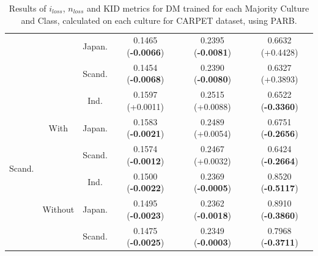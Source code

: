 \begin{table}[H]
\begin{tabular}{c|c|c|c|c|c}
 &  & Japan.   & 0.1465 (\textbf{-0.0066})       & 0.2395 (\textbf{-0.0081})       & 0.6632 (+0.4428) \\
 &  & Scand. & 0.1454 (\textbf{-0.0068})       & 0.2390 (\textbf{-0.0080})       & 0.6327 (+0.3893)  \\
\midrule
\multirow{6}{*}{Scand.} & \multirow{3}{*}{With} & Ind.     & 0.1597 (+0.0011)       & 0.2515 (+0.0088)       & 0.6522 (\textbf{-0.3360})  \\
 &  & Japan.   & 0.1583 (\textbf{-0.0021})       & 0.2489 (+0.0054)       & 0.6751 (\textbf{-0.2656})  \\
 &  & Scand. & 0.1574 (\textbf{-0.0012})       & 0.2467 (+0.0032)       & 0.6424 (\textbf{-0.2664})  \\
\hhline{~-----}
 & \multirow{3}{*}{Without} & Ind.     & 0.1500 (\textbf{-0.0022})       & 0.2369 (\textbf{-0.0005})       & 0.8520 (\textbf{-0.5117}) \\
 &  & Japan.   & 0.1495 (\textbf{-0.0023})       & 0.2362 (\textbf{-0.0018})       & 0.8910 (\textbf{-0.3860})  \\
 &  & Scand. & 0.1475 (\textbf{-0.0025})       & 0.2349 (\textbf{-0.0003})       & 0.7968 (\textbf{-0.3711})  \\
\bottomrule
    \end{tabular}
    \caption{Results of $i_{loss}$, $n_{loss}$ and KID metrics for DM trained for each Majority Culture and Class, calculated on each culture for CARPET dataset, using PARB.}
    \label{ch3:tab:ris:dm:parb:carpet}
\end{table}
%
%
